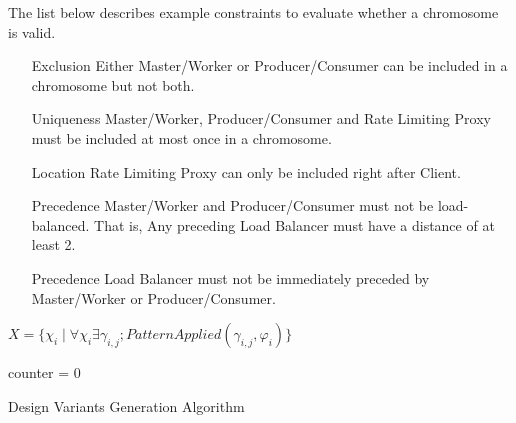 The list below describes example constraints to evaluate whether a chromosome is valid.

\begin{enumerate}[wide=0pt, widest={\bfseries Precedence}, leftmargin=*, font=\bfseries]
	\item[Exclusion] Either Master/Worker or Producer/Consumer can be included in a chromosome but not both.
	\item[Uniqueness] Master/Worker, Producer/Consumer and Rate Limiting Proxy must be included at most once in a chromosome.
	\item[Location] Rate Limiting Proxy can only be included right after Client.
	\item[Precedence] Master/Worker and Producer/Consumer must not be load-balanced. That is, Any preceding Load Balancer must have a distance of at least 2.
	\item[Precedence] Load Balancer must not be immediately preceded by Master/Worker or Producer/Consumer.
\end{enumerate}

\begin{algorithm}[h]
	\footnotesize
	\DontPrintSemicolon
	\SetAlgoLined
	
	\(X = \{\chi_{i} \mid \forall \chi_{i} \exists \gamma_{i,j}; PatternApplied(\gamma_{i,j},\varphi_{i}) \}\)
	
	counter = 0\;
	
	\caption{Design Variants Generation Algorithm}
	\label{alg:architectural-framework--ga-variants-generation}
\end{algorithm}


